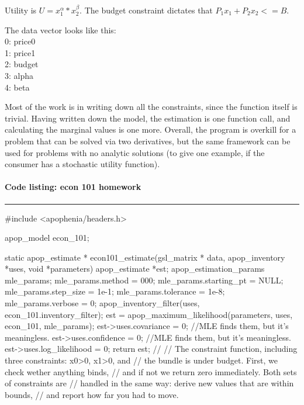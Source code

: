 Utility is $U = x_1^\alpha * x_2^\beta$. 
The budget constraint dictates that $P_1 x_1 + P_2 x_2 <= B$.
                                                             
The data vector looks like this:\\
0:  price0\\
1:  price1\\
2:  budget \\
3:  alpha  \\
4:  beta   
                                                             
Most of the work is in writing down all the constraints, since the
function itself is trivial. Having written down the model, the estimation
is one function call, and calculating the marginal values is one more.
Overall, the program is overkill for a problem that can be solved via
two derivatives, but the same framework can be used for problems with no
analytic solutions (to give one example, if the consumer has a stochastic
utility function).

\paragraph{Code listing: econ 101 homework}
\hrule 
#include <apophenia/headers.h>

apop_model econ_101;

static apop_estimate * econ101_estimate(gsl_matrix * data, 
                            apop_inventory *uses, void *parameters){
apop_estimate           *est;
apop_estimation_params  mle_params;
    mle_params.method       = 000;
    mle_params.starting_pt  = NULL;
    mle_params.step_size    = 1e-1;
    mle_params.tolerance    = 1e-8;
    mle_params.verbose      = 0;
    apop_inventory_filter(uses, econ_101.inventory_filter);
    est = apop_maximum_likelihood(parameters, uses, econ_101, mle_params);
    est->uses.covariance    = 0;    //MLE finds them, but it's meaningless.
    est->uses.confidence    = 0;    //MLE finds them, but it's meaningless.
    est->uses.log_likelihood  = 0;
    return est;
}
//
// The constraint function, including three constraints: x0>0, x1>0, and
// the bundle is under budget.  First, we check wether anything binds,
// and if not we return zero immediately.  Both sets of constraints are
// handled in the same way: derive new values that are within bounds,
// and report how far you had to move.

